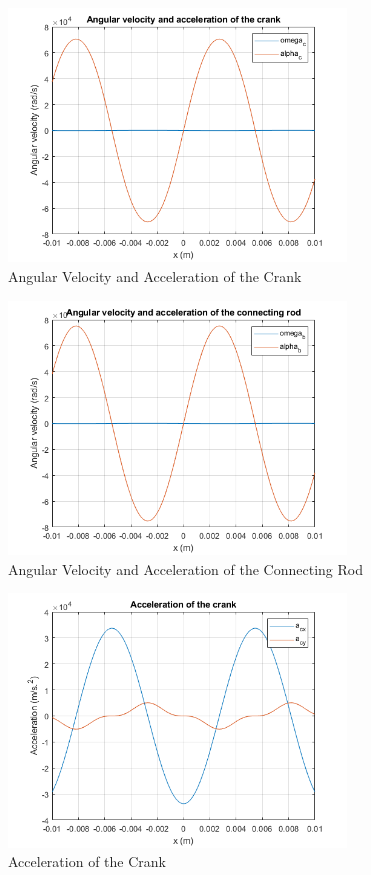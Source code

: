 \documentclass[12pt, titlepage]{article}
\begin{document}
\begin{figure}[H]
    \centering
    \includegraphics[width=0.8\textwidth]{./Images/4.png}
    \caption{Angular Velocity and Acceleration of the Crank}
    \label{fig:omegaalpha}
\end{figure}
\begin{figure}[H]
    \centering
    \includegraphics[width=0.8\textwidth]{./Images/5.png}
    \caption{Angular Velocity and Acceleration of the Connecting Rod}
    \label{fig:omegaalphab}
\end{figure}
\begin{figure}[H]
    \centering
    \includegraphics[width=0.8\textwidth]{./Images/6.png}
    \caption{Acceleration of the Crank}
    \label{fig:accc}
\end{figure}
\end{document}
